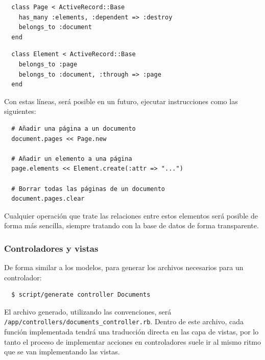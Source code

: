 \begin{verbatim}
  class Page < ActiveRecord::Base
    has_many :elements, :dependent => :destroy
    belongs_to :document
  end
\end{verbatim}

\begin{verbatim}
  class Element < ActiveRecord::Base
    belongs_to :page
    belongs_to :document, :through => :page
  end
\end{verbatim}


Con estas líneas, será posible en un futuro, ejecutar instrucciones como las siguientes:

\begin{verbatim}
  # Añadir una página a un documento
  document.pages << Page.new  
  
  # Añadir un elemento a una página
  page.elements << Element.create(:attr => "...") 
  
  # Borrar todas las páginas de un documento
  document.pages.clear
\end{verbatim}

Cualquier operación que trate las relaciones entre estos elementos será posible de forma más sencilla, siempre tratando con la base de datos de forma transparente. 


\subsubsection{Controladores y vistas} %
\label{ssub:controlador}

De forma similar a los modelos, para generar los archivos necesarios para un controlador:

\begin{verbatim}
  $ script/generate controller Documents
\end{verbatim}

El archivo generado, utilizando las convenciones, será \texttt{/app/controllers/documents\_controller.rb}. Dentro de este archivo, cada función implementada tendrá una traducción directa en las capa de vistas, por lo tanto el proceso de implementar acciones en controladores suele ir al mismo ritmo que se van implementando las vistas.

